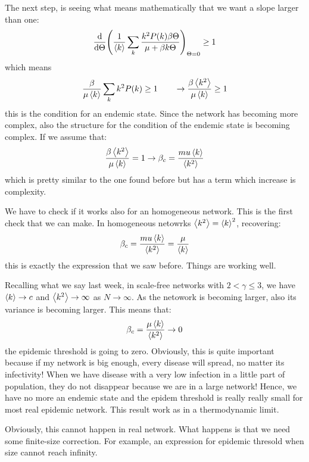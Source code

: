 \documentclass[../main/main.tex]{subfiles}
\begin{document}
The next step, is seeing what means mathematically that we want a slope larger than one:
\begin{equation*}
  \dv{}{\Theta }  \qty( \frac{1}{\expval{k} } \sum_{k}^{} \frac{k^2 P(k) \beta \Theta }{\mu + \beta k \Theta } )_{\Theta =0} \ge 1
\end{equation*}
which means
\begin{equation*}
\frac{\beta }{\mu \expval{k} } \sum_{k}^{}k^2 P(k) \ge 1 \qquad \rightarrow  \frac{\beta \expval{k^2} }{\mu \expval{k} } \ge 1
\end{equation*}
this is the condition for an endemic state. Since the network has becoming more complex, also the structure for the condition of the endemic state is becoming complex.
If we assume that:
\begin{equation*}
 \frac{\beta \expval{k^2} }{\mu \expval{k} } = 1 \rightarrow \beta _c = \frac{mu \expval{k} }{\expval{k^2} }
\end{equation*}
which is pretty similar to the one found before but has a term which increase is complexity.

We have to check if it works also for an homogeneous network. This is the first check that we can make. In homogeneous netowrks \( \expval{k^2} = \expval{k}^2   \), recovering:
\begin{equation*}
  \beta _c = \frac{mu \expval{k} }{\expval{k^2} } = \frac{\mu }{\expval{k} }
\end{equation*}
this is exactly the expression that we saw before. Things are working well.

Recalling what we say last week, in scale-free networks with \( 2 < \gamma \le 3  \), we have \( \expval{k} \rightarrow c  \) and \( \expval{k^2}  \rightarrow \infty  \) as \( N \rightarrow \infty  \). As the netowork is becoming larger, also its variance is becoming larger. This means that:
\begin{equation*}
  \beta _c = \frac{\mu \expval{k} }{\expval{k^2} } \rightarrow 0
\end{equation*}
the epidemic threshold is going to zero.
Obviously, this is quite important because if my network is big enough, every disease will spread, no matter its infectivity!
When we have disease with a very low infection in a little part of population, they do not disappear because we are in a large network!
Hence, we have no more an endemic state and the epidem threshold is really really small for most real epidemic network.
This result work as in a thermodynamic limit.

Obviously, this cannot happen in real network. What happens is that we need some finite-size correction. For example, an expression for epidemic thresold when size cannot reach infinity.
\end{document}
